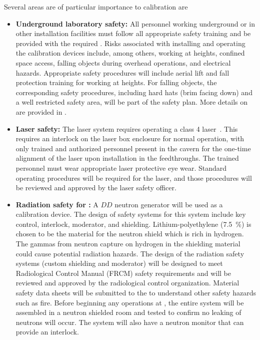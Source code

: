 Several areas are of particular importance to calibration are
\begin{itemize}
\item {\bf Underground laboratory safety:} All personnel working underground or in other installation facilities must follow all appropriate safety training and be provided with the required . Risks associated with installing and operating the calibration devices include, among others, working at heights, confined space access, falling objects during overhead operations, and electrical hazards. Appropriate safety procedures will include aerial lift and fall protection training for working at heights. For falling objects, the corresponding safety procedures, including hard hats (brim facing down) and a well restricted safety area, will be part of the safety plan. More details on  are provided in  \tcchesh{}. %

\item {\bf Laser safety:} The laser system requires operating a class 4 laser~\cite{FNAL:Class4Lasers,CERN:Class4Lasers}. This requires an interlock on the laser box enclosure for normal operation, with only trained and authorized personnel present in the cavern for the one-time alignment of the laser upon installation in the feedthroughs. The trained personnel must wear appropriate laser protective eye wear. Standard operating procedures will be required for the laser, and those procedures will be reviewed and approved by the  laser safety officer. 

\item {\bf Radiation safety for :} A $DD$ neutron generator will be used as a calibration device. The design of safety systems for this system include key control, interlock, moderator, and shielding. Lithium-polyethylene (\SI{7.5}{\%}) is chosen to be the material for the neutron shield which is rich in hydrogen. The gammas from neutron capture on hydrogen in the shielding material could cause potential radiation hazards. The design of the radiation safety systems (custom shielding and moderator) will be designed to meet  Radiological Control Manual (FRCM) safety requirements and will be reviewed and approved by the  radiological control organization. Material safety data sheets will be submitted to the   to understand other safety hazards such as fire. Before beginning any operations at , the entire system will be assembled in a neutron shielded room and tested to confirm no leaking of neutrons will occur. The system will also have a neutron monitor that can provide an interlock. 


\end{itemize}
